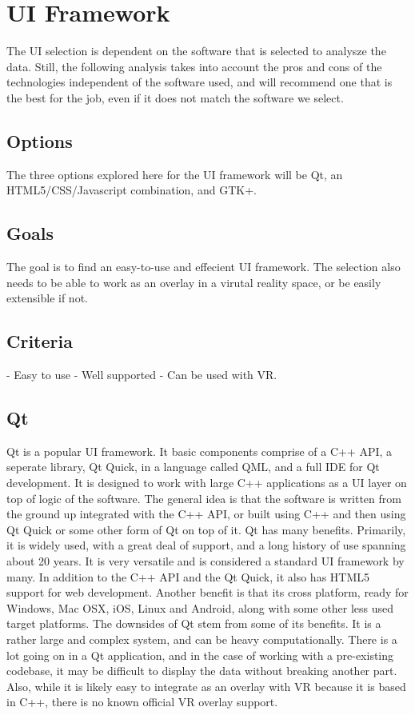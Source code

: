\documentclass{article}
\begin{document}
\section{UI Framework}

The UI selection is dependent on the software that is selected to analysze the data. Still, the
following analysis takes into account the pros and cons of the technologies independent of the software
used, and will recommend one that is the best for the job, even if it does not match the software we 
select.

\subsection{Options}
The three options explored here for the UI framework will be Qt, an HTML5/CSS/Javascript combination,
and GTK+.

\subsection{Goals}
The goal is to find an easy-to-use and effecient UI framework. The selection
also needs to be able to work as an overlay in a virutal reality space, or be
easily extensible if not. 

\subsection{Criteria}
- Easy to use
- Well supported
- Can be used with VR.

\subsection{Qt}
Qt is a popular UI framework. It basic components comprise of a C++ API, a seperate library, Qt Quick,
in a language called QML, and a full IDE for Qt development. It is designed to work with large C++ applications
as a UI layer on top of logic of the software. The general idea is that the software is written from the ground
up integrated with the C++ API, or built using C++ and then using Qt Quick or some other form of Qt on top of 
it. Qt has many benefits. Primarily, it is widely used, with a great deal of support, and a long history of
use spanning about 20 years. It is very versatile and is considered a standard UI framework by many. In
addition to the C++ API and the Qt Quick, it also has HTML5 support for web development. Another benefit
is that its cross platform, ready for Windows, Mac OSX, iOS, Linux and Android, along with some other 
less used target platforms. The downsides of Qt stem from some of its benefits. It is a rather large
and complex system, and can be heavy computationally. There is a lot going on in a Qt application,
and in the case of working with a pre-existing codebase, it may be difficult to display the data
without breaking another part. Also, while it is likely easy to integrate as an overlay with VR
because it is based in C++, there is no known official VR overlay support. \cite{qtsoft}
\end{document}
